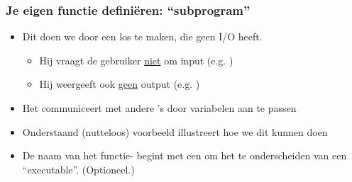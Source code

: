 \begin{frame}
\frametitle{Je eigen functie defini\"eren: ``subprogram''}


\begin{itemize}
  \item<1-> Dit doen we door een los  te maken, die geen I/O heeft.
  \begin{itemize}
    \item<2-> Hij vraagt de gebruiker \underline{niet} om input (e.g. )
    \item<3-> Hij weergeeft ook \underline{geen} output (e.g. )
  \end{itemize}
  \item<4-> Het  communiceert met andere 's door variabelen aan te passen
  \item<5-> Onderstaand (nutteloos) voorbeeld illustreert hoe we dit kunnen doen
  \item<6-> De naam van het functie- begint met een \tifonttxt{\theta} om het  te onderscheiden van een ``executable''. (Optioneel.)
\end{itemize}

\vspace{2.5cm}




\end{frame}




